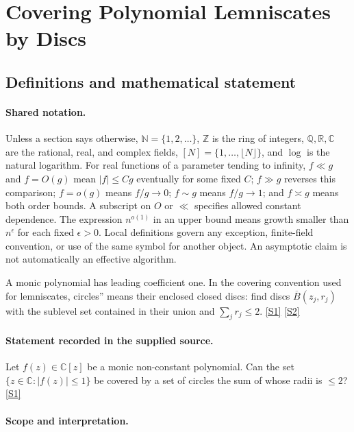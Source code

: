 \documentclass[11pt,a4paper]{article}
\newcommand{\N}{\mathbb{N}}
\newcommand{\Z}{\mathbb{Z}}
\newcommand{\Q}{\mathbb{Q}}
\newcommand{\R}{\mathbb{R}}
\newcommand{\C}{\mathbb{C}}
\newcommand{\sref}[2]{\hyperlink{source:#1:#2}{[S#2]}}
\begin{document}
\section{Covering Polynomial Lemniscates by Discs}\label{statement}


\subsection{Definitions and mathematical statement}

\paragraph{Shared notation.}Unless a section says otherwise, $\N=\{1,2,\ldots\}$,
$\Z$ is the ring of integers, $\Q,\R,\C$ are the rational, real, and complex
fields, $[N]=\{1,\ldots,\lfloor N\rfloor\}$, and $\log$ is the natural
logarithm. For real functions of a parameter tending to infinity,
$f\ll g$ and $f=O(g)$ mean $|f|\leq Cg$ eventually for some fixed $C$;
$f\gg g$ reverses this comparison; $f=o(g)$ means $f/g\to0$;
$f\sim g$ means $f/g\to1$; and $f\asymp g$ means both order bounds.
A subscript on $O$ or $\ll$ specifies allowed constant dependence.
The expression $n^{o(1)}$ in an upper bound means growth smaller than
$n^\epsilon$ for each fixed $\epsilon>0$. Local definitions govern any
exception, finite-field convention, or use of the same symbol for another
object. An asymptotic claim is not automatically an effective algorithm.



A monic polynomial has leading coefficient one. In the covering convention used for lemniscates, circles'' means their enclosed closed discs: find discs $\overline B(z_j,r_j)$ with the sublevel set contained in their union and $\sum_jr_j\leq2$. \sref{statement}{1} \sref{statement}{2}

\paragraph{Statement recorded in the supplied source.}
Let $f(z)\in\mathbb{C}[z]$ be a monic non-constant polynomial. Can the set $ \{ z\in \mathbb{C} : \lvert f(z)\rvert \leq 1\} $ be covered by a set of circles the sum of whose radii is $\leq 2$? \sref{statement}{1}

\paragraph{Scope and interpretation.}
\end{document}
